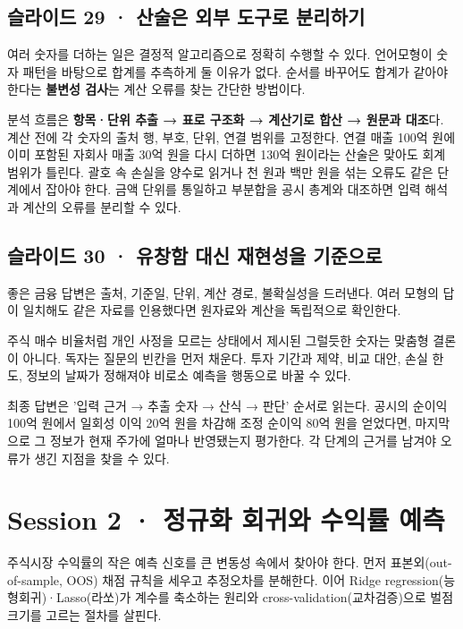 \documentclass[11pt,a4paper]{article}
\begin{document}
\subsection{슬라이드 29 · 산술은 외부 도구로 분리하기}
여러 숫자를 더하는 일은 결정적 알고리즘으로 정확히 수행할 수 있다. 언어모형이 숫자 패턴을 바탕으로 합계를 추측하게 둘 이유가 없다. 순서를 바꾸어도 합계가 같아야 한다는 \textbf{불변성 검사}는 계산 오류를 찾는 간단한 방법이다.\par

분석 흐름은 \textbf{항목·단위 추출 → 표로 구조화 → 계산기로 합산 → 원문과 대조}다. 계산 전에 각 숫자의 출처 행, 부호, 단위, 연결 범위를 고정한다. 연결 매출 100억 원에 이미 포함된 자회사 매출 30억 원을 다시 더하면 130억 원이라는 산술은 맞아도 회계 범위가 틀린다. 괄호 속 손실을 양수로 읽거나 천 원과 백만 원을 섞는 오류도 같은 단계에서 잡아야 한다. 금액 단위를 통일하고 부분합을 공시 총계와 대조하면 입력 해석과 계산의 오류를 분리할 수 있다.\par

\subsection{슬라이드 30 · 유창함 대신 재현성을 기준으로}
좋은 금융 답변은 출처, 기준일, 단위, 계산 경로, 불확실성을 드러낸다. 여러 모형의 답이 일치해도 같은 자료를 인용했다면 원자료와 계산을 독립적으로 확인한다.\par

주식 매수 비율처럼 개인 사정을 모르는 상태에서 제시된 그럴듯한 숫자는 맞춤형 결론이 아니다. 독자는 질문의 빈칸을 먼저 채운다. 투자 기간과 제약, 비교 대안, 손실 한도, 정보의 날짜가 정해져야 비로소 예측을 행동으로 바꿀 수 있다.\par

최종 답변은 '입력 근거 → 추출 숫자 → 산식 → 판단' 순서로 읽는다. 공시의 순이익 100억 원에서 일회성 이익 20억 원을 차감해 조정 순이익 80억 원을 얻었다면, 마지막으로 그 정보가 현재 주가에 얼마나 반영됐는지 평가한다. 각 단계의 근거를 남겨야 오류가 생긴 지점을 찾을 수 있다.\par

\section{Session 2 · 정규화 회귀와 수익률 예측}
주식시장 수익률의 작은 예측 신호를 큰 변동성 속에서 찾아야 한다. 먼저 표본외(out-of-sample, OOS) 채점 규칙을 세우고 추정오차를 분해한다. 이어 Ridge regression(능형회귀)·Lasso(라쏘)가 계수를 축소하는 원리와 cross-validation(교차검증)으로 벌점 크기를 고르는 절차를 살핀다.\par
\end{document}

